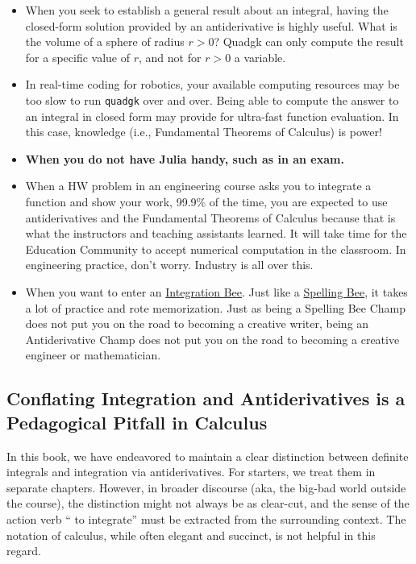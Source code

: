 {\begin{itemize}
\item When you seek to establish a general result about an integral, having the closed-form solution provided by an antiderivative is highly useful. What is the volume of a sphere of radius $r>0$? Quadgk can only compute the result for a specific value of $r$, and not for $r>0$ a variable.
    \item In real-time coding for robotics, your available computing resources may be too slow to run \texttt{quadgk} over and over. Being able to compute the answer to an integral in closed form may provide for ultra-fast function evaluation. In this case, knowledge (i.e., Fundamental Theorems of Calculus) is power!
    \item {\bf When you do not have Julia handy, such as in an exam.} 
    \item When a HW problem in an engineering course asks you to integrate a function and show your work, 99.9\% of the time, you are expected to use antiderivatives and the Fundamental Theorems of Calculus because that is what the instructors and teaching assistants learned. It will take time for the Education Community to accept numerical computation in the classroom. In engineering practice, don't worry. Industry is all over this. 
    \item When you want to enter an \href{https://www.youtube.com/results?search_query=integration+bees}{Integration Bee}. Just like a \href{https://www.youtube.com/results?search_query=spelling+bees}{Spelling Bee}, it takes a lot of practice and rote memorization. Just as being a Spelling Bee Champ does not put you on the road to becoming a creative writer, being an Antiderivative Champ does not put you on the road to becoming a creative engineer or mathematician. 
\end{itemize}
}

\subsection{Conflating Integration and Antiderivatives is a Pedagogical Pitfall in Calculus}
\label{sec:PedagogicalPitfall}

In this book, we have endeavored to maintain a clear distinction between definite integrals and integration via antiderivatives. For starters, we treat them in separate chapters. However, in broader discourse (aka, the big-bad world outside the course), the distinction might not always be as clear-cut, and the sense of the action verb `` to integrate'' must be extracted from the surrounding context. The notation of calculus, while often elegant and succinct, is not helpful in this regard. 

